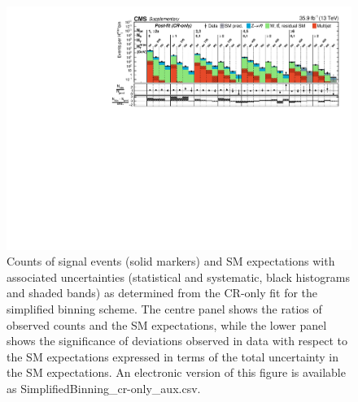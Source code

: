 \begin{figure}[h!]
  \centering
  \includegraphics[width=0.95\linewidth]{Supplementary/CMS-SUS-16-038_Figure-aux_011} 
  \caption{Counts of signal events (solid markers) and SM expectations
    with associated uncertainties (statistical and systematic, black
    histograms and shaded bands) 
    as determined from the CR-only fit
    for the simplified binning scheme.
    The centre panel shows the ratios of
    observed counts and the SM expectations, while the lower panel
    shows the significance of deviations observed in data with respect
    to the SM expectations expressed in terms of the total uncertainty
    in the SM expectations.
    An electronic version of this figure is available as SimplifiedBinning\_cr-only\_aux.csv.
    }
  \label{fig:aggregated_results_cr-only}
\end{figure}

